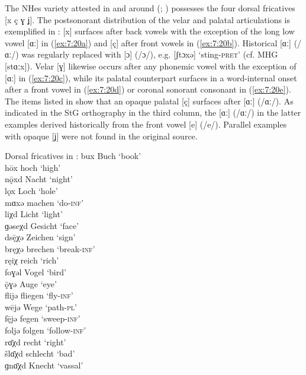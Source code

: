 The NHes variety attested in and around  (\citealt{Bromm1936}; ) possesses the four dorsal fricatives [x ç ɣ ʝ]. The postsonorant distribution of the velar and palatal articulations is exemplified in : [x] surfaces after back vowels with the exception of the long low vowel [ɑː] in (\ref{ex:7:20a}) and [ç] after front vowels in (\ref{ex:7:20b}). Historical [ɑː] (/ɑː/) was regularly replaced with [ɔ] (/ɔ/), e.g. [ʃtɔxə] ‘sting-\textsc{pret}’ (cf. MHG [stɑːx]). Velar [ɣ] likewise occurs after any phonemic vowel with the exception of [ɑː] in (\ref{ex:7:20c}), while its palatal counterpart surfaces in a word-internal onset after a front vowel in (\ref{ex:7:20d}) or coronal sonorant consonant in (\ref{ex:7:20e}). The items listed in  show that an opaque palatal [ç] surfaces after [ɑː] (/ɑː/). As indicated in the StG orthography in the third column, the [ɑː] (/ɑː/) in the latter examples derived historically from the front vowel [e] (/e/). Parallel examples with opaque [ʝ] were not found in the original source.

\ea%
\label{ex:7:20}Dorsal fricatives in :
\ea\label{ex:7:20a} bux \tab [bux] \tab Buch \tab ‘book’ \\
hōx \tab [hoːx] \tab hoch \tab ‘high’ \\
nǭxd \tab [nɔːxt] \tab  Nacht \tab  ‘night’ \\
lǫx \tab [lɔx] \tab Loch \tab ‘hole’ \\
mɑxə \tab [mɑxə] \tab machen \tab ‘do\textsc{{}-inf}’ \\
\ex\label{ex:7:20b} liχd \tab  [liçt] \tab Licht \tab ‘light’ \\
ɡəseχd \tab [gəseçt] \tab Gesicht \tab ‘face’ \\
ds\={ę}χə \tab [tsɛːçə] \tab Zeichen \tab ‘sign’ \\
bręχə \tab [brɛçə] \tab brechen \tab ‘break\textsc{{}-inf}’ \\
ręiχ \tab [rɛiç] \tab reich \tab ‘rich’ \\
\ex\label{ex:7:20c} foɣəl \tab [foɣəl] \tab  Vogel \tab ‘bird’ \\
ǭɣə \tab [ɔːɣə] \tab Auge \tab ‘eye’ \\
\ex\label{ex:7:20d} flijə \tab  [fliʝə] \tab fliegen \tab ‘fly\textsc{{}-inf}’ \\
wējə \tab [veːʝə] \tab Wege \tab ‘path-\textsc{pl}’ \\
f\={ę}jə \tab [fɛːʝə] \tab fegen \tab ‘sweep\textsc{{}-inf}’ \\
\ex\label{ex:7:20e} foljə \tab [folʝə] \tab  folgen \tab ‘follow\textsc{{}-inf}’ \\
\ex\label{ex:7:20f} rɑ̄χd \tab [rɑːçt] \tab  recht \tab ‘right’ \\
šlɑ̄χd \tab [ʃlɑːçt] \tab  schlecht \tab ‘bad’ \\
ɡnɑ̄χd \tab [knɑːçt] \tab  Knecht \tab ‘vassal’ \\
\z
\z 

